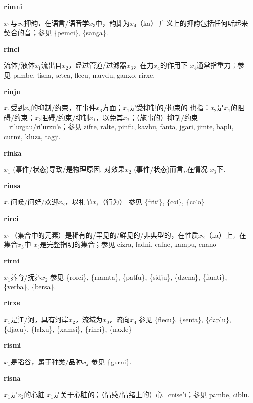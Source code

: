 \documentclass[notitlepage,twocolumn,a4paper,10pt]{book}
\begin{document}
{\sffamily\bfseries rimni}\enspace {\ttfamily\bfseries[rim]}  $x_1$与$x_2$押韵，在语言\slash{}语音学$x_3$中，韵脚为$x_4$（ka） \textemdash{} 广义上的押韵包括任何听起来契合的音；参见 \{pemci\}, \{sanga\}.

{\sffamily\bfseries rinci} 流体\slash{}液体$x_1$流出自$x_2$，经过管道\slash{}过滤器$x_3$，在力$x_4$的作用下 \textemdash{} $x_4$通常指重力；参见 {pambe}, {tisna}, {setca}, {flecu}, {muvdu}, {ganxo}, {rirxe}.

{\sffamily\bfseries rinju}\enspace {\ttfamily\bfseries[        ri'u]}  $x_1$受到$x_2$的抑制\slash{}约束，在事件$x_3$方面；$x_1$是受抑制的\slash{}拘束的 \textemdash{} 也指：$x_2$是$x_1$的阻碍\slash{}约束；$x_2$阻碍\slash{}约束\slash{}抑制$x_1$，以免其$x_3$；（施事的）抑制\slash{}约束={ri'urgau}\slash{}{ri'urzu'e}；参见 {zifre}, {ralte}, {pinfu}, {kavbu}, {fanta}, {jgari}, {jimte}, {bapli}, {curmi}, {kluza}, {tagji}.

{\sffamily\bfseries rinka}\enspace {\ttfamily\bfseries[rik     ri'a]}  $x_1$ (事件\slash{}状态)导致\slash{}是物理原因,   对效果$x_2$ (事件\slash{}状态)而言,.在情况 $x_3$下.

{\sffamily\bfseries rinsa} $x_1$问候\slash{}问好\slash{}欢迎$x_2$，以礼节$x_3$（行为） \textemdash{} 参见 \{friti\}, \{coi\}, \{co'o\}

{\sffamily\bfseries rirci} $x_1$（集合中的元素）是稀有的\slash{}罕见的\slash{}鲜见的\slash{}非典型的，在性质$x_2$（ka）上，在集合$x_3$中 \textemdash{} $x_3$是完整指明的集合；参见 {cizra}, {fadni}, {cafne}, {kampu}, {cnano}

{\sffamily\bfseries rirni}\enspace {\ttfamily\bfseries[rir]}  $x_1$养育\slash{}抚养$x_2$ \textemdash{} 参见 \{rorci\}, \{mamta\}, \{patfu\}, \{sidju\}, \{dzena\}, \{famti\}, \{verba\}, \{bersa\}.

{\sffamily\bfseries rirxe}\enspace {\ttfamily\bfseries[        ri'e]}  $x_1$是江\slash{}河，具有河岸$x_2$，流域为$x_3$，流向$x_4$ \textemdash{} 参见 \{flecu\}, \{senta\}, \{daplu\}, \{djacu\}, \{lalxu\}, \{xamsi\}, \{rinci\}, \{naxle\}

{\sffamily\bfseries rismi}\enspace {\ttfamily\bfseries[ris]}  $x_1$是稻谷，属于种类\slash{}品种$x_2$ \textemdash{} 参见 \{gurni\}.

{\sffamily\bfseries risna} $x_1$是$x_2$的心脏 \textemdash{} $x_1$是关于心脏的；（情感\slash{}情绪上的）心={cnise'i}；参见 {pambe}, {ciblu}.
\end{document}
